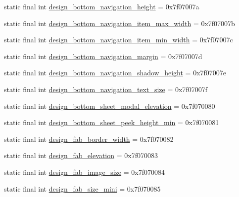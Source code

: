 \begin{CompactItemize}
\item 
static final int \hyperlink{classcom_1_1companyname_1_1x__2doo_1_1_r_1_1dimen_84f168a7dcdbd1fd5a44dd9bfcbddc61}{design\_\-bottom\_\-navigation\_\-height} = 0x7f07007a
\item 
static final int \hyperlink{classcom_1_1companyname_1_1x__2doo_1_1_r_1_1dimen_774f385e3ca59b3521471c659b7bd1a9}{design\_\-bottom\_\-navigation\_\-item\_\-max\_\-width} = 0x7f07007b
\item 
static final int \hyperlink{classcom_1_1companyname_1_1x__2doo_1_1_r_1_1dimen_efc55f4ceca9a0a547ac29b923be9beb}{design\_\-bottom\_\-navigation\_\-item\_\-min\_\-width} = 0x7f07007c
\item 
static final int \hyperlink{classcom_1_1companyname_1_1x__2doo_1_1_r_1_1dimen_e96ea47082516ba602aac045ddb04c03}{design\_\-bottom\_\-navigation\_\-margin} = 0x7f07007d
\item 
static final int \hyperlink{classcom_1_1companyname_1_1x__2doo_1_1_r_1_1dimen_cf3bf128ab0f240f88f81918fefedbe9}{design\_\-bottom\_\-navigation\_\-shadow\_\-height} = 0x7f07007e
\item 
static final int \hyperlink{classcom_1_1companyname_1_1x__2doo_1_1_r_1_1dimen_1e153fa441a9089533b9a7735898d729}{design\_\-bottom\_\-navigation\_\-text\_\-size} = 0x7f07007f
\item 
static final int \hyperlink{classcom_1_1companyname_1_1x__2doo_1_1_r_1_1dimen_416e132decae59eda5af70dc4be8e4ee}{design\_\-bottom\_\-sheet\_\-modal\_\-elevation} = 0x7f070080
\item 
static final int \hyperlink{classcom_1_1companyname_1_1x__2doo_1_1_r_1_1dimen_45425ee0407c6b2e543ab27ae251d5a6}{design\_\-bottom\_\-sheet\_\-peek\_\-height\_\-min} = 0x7f070081
\item 
static final int \hyperlink{classcom_1_1companyname_1_1x__2doo_1_1_r_1_1dimen_e8fbe48d18f82b533a3171117d8e2445}{design\_\-fab\_\-border\_\-width} = 0x7f070082
\item 
static final int \hyperlink{classcom_1_1companyname_1_1x__2doo_1_1_r_1_1dimen_ef8a1ad607282e60193a19790ae17ee5}{design\_\-fab\_\-elevation} = 0x7f070083
\item 
static final int \hyperlink{classcom_1_1companyname_1_1x__2doo_1_1_r_1_1dimen_5f1a65543f80083cb08b6b04f9187957}{design\_\-fab\_\-image\_\-size} = 0x7f070084
\item 
static final int \hyperlink{classcom_1_1companyname_1_1x__2doo_1_1_r_1_1dimen_dbd240d3752ce7498fdc0cbe790a3ee6}{design\_\-fab\_\-size\_\-mini} = 0x7f070085
\item 

\end{CompactItemize}
